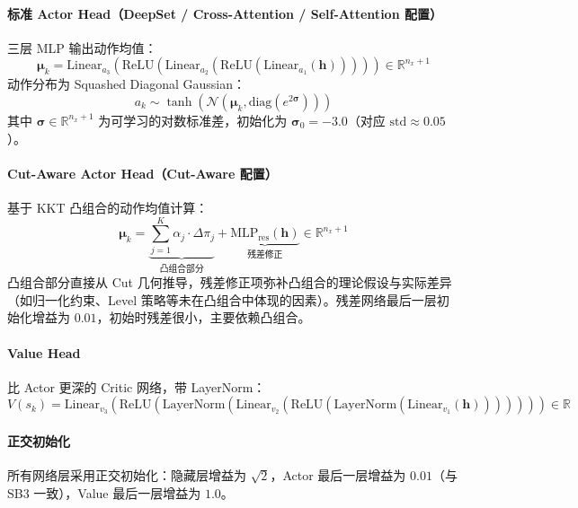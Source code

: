 \documentclass[11pt]{ctexart}
\begin{document}
\paragraph{标准 Actor Head（DeepSet / Cross-Attention / Self-Attention 配置）}
三层 MLP 输出动作均值：
\begin{equation}
\boldsymbol{\mu}_k = \mathrm{Linear}_{a_3}\!\left(\mathrm{ReLU}\!\left(\mathrm{Linear}_{a_2}\!\left(\mathrm{ReLU}\!\left(\mathrm{Linear}_{a_1}\!\left(\mathbf{h}\right)\right)\right)\right)\right) \in \mathbb{R}^{n_x + 1}
\end{equation}
动作分布为 Squashed Diagonal Gaussian：
\begin{equation}
a_k \sim \tanh\!\left(\mathcal{N}\!\left(\boldsymbol{\mu}_k, \mathrm{diag}\!\left(e^{2\boldsymbol{\sigma}}\right)\right)\right)
\end{equation}
其中 $\boldsymbol{\sigma} \in \mathbb{R}^{n_x + 1}$ 为可学习的对数标准差，初始化为 $\boldsymbol{\sigma}_0 = -3.0$（对应 $\mathrm{std} \approx 0.05$）。

\paragraph{Cut-Aware Actor Head（Cut-Aware 配置）}
基于 KKT 凸组合的动作均值计算：
\begin{equation}
\boldsymbol{\mu}_k = \underbrace{\sum_{j=1}^{K} \alpha_j \cdot \Delta\pi_j}_{\text{凸组合部分}} + \underbrace{\mathrm{MLP}_{\text{res}}\!\left(\mathbf{h}\right)}_{\text{残差修正}} \in \mathbb{R}^{n_x + 1}
\end{equation}
凸组合部分直接从 Cut 几何推导，残差修正项弥补凸组合的理论假设与实际差异（如归一化约束、Level 策略等未在凸组合中体现的因素）。残差网络最后一层初始化增益为 $0.01$，初始时残差很小，主要依赖凸组合。

\paragraph{Value Head}
比 Actor 更深的 Critic 网络，带 LayerNorm：
\begin{equation}
V(s_k) = \mathrm{Linear}_{v_3}\!\left(\mathrm{ReLU}\!\left(\mathrm{LayerNorm}\!\left(\mathrm{Linear}_{v_2}\!\left(\mathrm{ReLU}\!\left(\mathrm{LayerNorm}\!\left(\mathrm{Linear}_{v_1}\!\left(\mathbf{h}\right)\right)\right)\right)\right)\right)\right) \in \mathbb{R}
\end{equation}

\paragraph{正交初始化}
所有网络层采用正交初始化：隐藏层增益为 $\sqrt{2}$，Actor 最后一层增益为 $0.01$（与 SB3 一致），Value 最后一层增益为 $1.0$。
\end{document}
